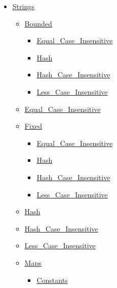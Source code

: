\documentclass[english]{article}
\begin{document}
\begin{scriptsize}
\begin{multicols*}{5}
\begin{itemize}[leftmargin=0mm]
\begin{itemize}[leftmargin=5mm]
\begin{itemize}[leftmargin=5mm]
	\end{itemize}
  \item[] \href{http://www.ada-auth.org/standards/22rm/html/RM-A-4-1.html}{Strings}
	\begin{itemize}[leftmargin=5mm]
	\item[] \href{http://www.ada-auth.org/standards/22rm/html/RM-A-4-4.html}{Bounded}
	  \begin{itemize}[leftmargin=5mm]
	  \item[] \href{http://www.ada-auth.org/standards/22rm/html/RM-A-4-10.html}{Equal\_Case\_Insensitive}
	  \item[] \href{http://www.ada-auth.org/standards/22rm/html/RM-A-4-9.html}{Hash}
	  \item[] \href{http://www.ada-auth.org/standards/22rm/html/RM-A-4-9.html}{Hash\_Case\_Insensitive}
	  \item[] \href{http://www.ada-auth.org/standards/22rm/html/RM-A-4-10.html}{Less\_Case\_Insensitive}
	  \end{itemize}
	\item[] \href{http://www.ada-auth.org/standards/22rm/html/RM-A-4-10.html}{Equal\_Case\_Insensitive}
	\item[] \href{http://www.ada-auth.org/standards/22rm/html/RM-A-4-3.html}{Fixed}
	  \begin{itemize}[leftmargin=5mm]
	  \item[] \href{http://www.ada-auth.org/standards/22rm/html/RM-A-4-10.html}{Equal\_Case\_Insensitive}
	  \item[] \href{http://www.ada-auth.org/standards/22rm/html/RM-A-4-9.html}{Hash}
	  \item[] \href{http://www.ada-auth.org/standards/22rm/html/RM-A-4-9.html}{Hash\_Case\_Insensitive}
	  \item[] \href{http://www.ada-auth.org/standards/22rm/html/RM-A-4-10.html}{Less\_Case\_Insensitive}
	  \end{itemize}
	\item[] \href{http://www.ada-auth.org/standards/22rm/html/RM-A-4-9.html}{Hash}
	\item[] \href{http://www.ada-auth.org/standards/22rm/html/RM-A-4-9.html}{Hash\_Case\_Insensitive}
	\item[] \href{http://www.ada-auth.org/standards/22rm/html/RM-A-4-10.html}{Less\_Case\_Insensitive}
	\item[] \href{http://www.ada-auth.org/standards/22rm/html/RM-A-4-2.html}{Maps}
	  \begin{itemize}[leftmargin=5mm]
	  \item[] \href{http://www.ada-auth.org/standards/22rm/html/RM-A-4-6.html}{Constants}

\end{itemize}
\end{itemize}
\end{itemize}
\end{itemize}
\end{multicols*}
\end{scriptsize}
\end{document}
